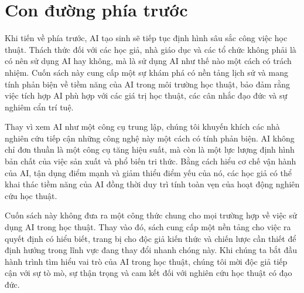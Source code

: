 \section{Con đường phía trước}

Khi tiến về phía trước, AI tạo sinh sẽ tiếp tục định hình sâu sắc công việc học thuật. Thách thức đối với các học giả, nhà giáo dục và các tổ chức không phải là có nên sử dụng AI hay không, mà là sử dụng AI như thế nào một cách có trách nhiệm. Cuốn sách này cung cấp một sự khám phá có nền tảng lịch sử và mang tính phản biện về tiềm năng của AI trong môi trường học thuật, bảo đảm rằng việc tích hợp AI phù hợp với các giá trị học thuật, các cân nhắc đạo đức và sự nghiêm cẩn trí tuệ.

Thay vì xem AI như một công cụ trung lập, chúng tôi khuyến khích các nhà nghiên cứu tiếp cận những công nghệ này một cách có tính phản biện. AI không chỉ đơn thuần là một công cụ tăng hiệu suất, mà còn là một lực lượng định hình bản chất của việc sản xuất và phổ biến tri thức. Bằng cách hiểu cơ chế vận hành của AI, tận dụng điểm mạnh và giảm thiểu điểm yếu của nó, các học giả có thể khai thác tiềm năng của AI đồng thời duy trì tính toàn vẹn của hoạt động nghiên cứu học thuật.

Cuốn sách này không đưa ra một công thức chung cho mọi trường hợp về việc sử dụng AI trong học thuật. Thay vào đó, sách cung cấp một nền tảng cho việc ra quyết định có hiểu biết, trang bị cho độc giả kiến thức và chiến lược cần thiết để định hướng trong lĩnh vực đang thay đổi nhanh chóng này. Khi chúng ta bắt đầu hành trình tìm hiểu vai trò của AI trong học thuật, chúng tôi mời độc giả tiếp cận với sự tò mò, sự thận trọng và cam kết đối với nghiên cứu học thuật có đạo đức.
